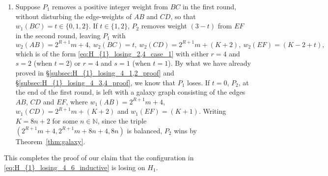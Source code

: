 \documentclass[11pt,reqno]{amsart}
\theoremstyle{definition}
\theoremstyle{definition}
\begin{document}
\begin{enumerate}
\item Suppose $P_{1}$ removes a positive integer weight from $BC$ in the first round, without disturbing the edge-weights of $AB$ and $CD$, so that $w_{1}(BC)=t\in\{0,1,2\}$. If $t\in\{1,2\}$, $P_{2}$ removes weight $(3-t)$ from $EF$ in the second round, leaving $P_{1}$ with
\begin{equation}
w_{2}(AB)=2^{R+1}m+4,\ w_{2}(BC)=t,\ w_{2}(CD)=2^{R+1}m+(K+2),\ w_{2}(EF)=(K-2+t),\nonumber
\end{equation}
which is of the form \eqref{eq:H_{1}_losing_2,4_case_1} with either $r=4$ and $s=2$ (when $t=2$) or $r=4$ and $s=1$ (when $t=1$). By what we have already proved in \S\ref{subsec:H_{1}_losing_4_1,2_proof} and \S\ref{subsec:H_{1}_losing_4_3,4_proof}, we know that $P_{1}$ loses. If $t=0$, $P_{2}$, at the end of the first round, is left with a galaxy graph consisting of the edges $AB$, $CD$ and $EF$, where $w_{1}(AB)=2^{R+1}m+4$, $w_{1}(CD)=2^{R+1}m+(K+2)$ and $w_{1}(EF)=(K+1)$. Writing $K=8n+2$ for some $n \in \mathbb{N}$, since the triple $(2^{R+1}m+4,2^{R+1}m+8n+4,8n)$ is balanced, $P_{2}$ wins by Theorem~\ref{thm:galaxy}. 
\end{enumerate}

This completes the proof of our claim that the configuration in \eqref{eq:H_{1}_losing_4_6_inductive} is losing on $H_{1}$.
\end{document}
